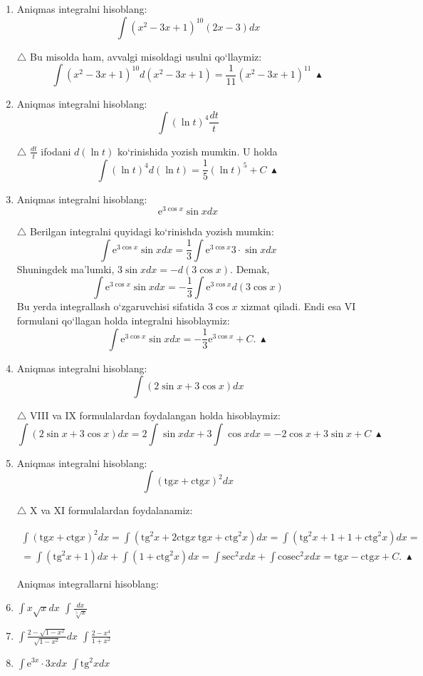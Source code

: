 \begin{enumerate}
	\item Aniqmas integralni hisoblang:
	$$\int (x^{2}-3x+1)^{10}(2x-3)dx$$
	
	$\triangle$ Bu misolda ham, avvalgi misoldagi usulni qo`llaymiz:
	$$\int (x^{2}-3x+1)^{10}d(x^{2}-3x+1)=\frac{1}{11}(x^{2}-3x+1)^{11}\ \blacktriangle$$
	
	\item Aniqmas integralni hisoblang:
	$$\int (\ln{t})^{4}\frac{dt}{t}$$
	
	$\triangle$ $\frac{dt}{t}$ ifodani $d(\ln{t})$ ko`rinishida yozish mumkin. U holda 
	$$\int (\ln{t})^{4}d(\ln{t})=\frac{1}{5}(\ln{t})^{5}+C\ \blacktriangle$$
	
	\item Aniqmas integralni hisoblang:
	$$\textrm{e}^{3\cos{x}}\sin{x}dx$$
	
	$\triangle$ Berilgan integralni quyidagi ko`rinishda yozish mumkin:
	$$\int \textrm{e}^{3\cos{x}}\sin{x}dx=\frac{1}{3}\int \textrm{e}^{3\cos{x}}3\cdot\sin{x}dx $$
	Shuningdek ma'lumki, $3\sin{x}dx=-d(3\cos{x})$. Demak,
	$$\int \textrm{e}^{3\cos{x}}\sin{x}dx=-\frac{1}{3}\int \textrm{e}^{3\cos{x}}d(3\cos{x})$$
	Bu yerda integrallash o`zgaruvchisi sifatida $3\cos{x}$ xizmat qiladi. Endi esa VI formulani qo`llagan holda integralni hisoblaymiz:
	$$\int \textrm{e}^{3\cos{x}}\sin{x}dx=-\frac{1}{3}\textrm{e}^{3\cos{x}}+C.\ \blacktriangle $$
	
	\item Aniqmas integralni hisoblang:
	$$\int (2\sin{x}+3\cos{x})dx$$
	
	$\triangle$ VIII va IX formulalardan foydalangan holda hisoblaymiz:
	$$\int (2\sin{x}+3\cos{x})dx=2\int \sin{x}dx + 3\int \cos{x}dx=-2\cos{x}+3\sin{x}+C\ \blacktriangle$$
	
	\item Aniqmas integralni hisoblang:
	$$\int (\textrm{tg}x+\textrm{ctg}x)^{2}dx$$
	
	$\triangle$ X va XI formulalardan foydalanamiz:
	
	\begin{multline*}
		\int (\textrm{tg}x+\textrm{ctg}x)^{2}dx =\int \left( \textrm{tg}^{2}x+2\textrm{ctg}x\ \textrm{tg}x+\textrm{ctg}^{2}x \right)dx= \int (\textrm{tg}^{2}x+1+1+\textrm{ctg}^{2}x)dx=\\
		=\int(\textrm{tg}^{2}x+1)dx+\int (1+\textrm{ctg}^{2}x)dx=\int \textrm{sec}^{2}xdx+\int \textrm{cosec}^{2}xdx=\textrm{tg}x-\textrm{ctg}x+C.\  \blacktriangle
	\end{multline*}

 Aniqmas integrallarni hisoblang:

\item $\int x\sqrt{x}dx$
\inlineitem $\int \frac{dx}{\sqrt[5]{x}}$

\item $ \int \frac{2-\sqrt{1-x^{2}}}{\sqrt{1-x^{2}}}dx$
\inlineitem $\int \frac{2-x^{4}}{1+x^{2}}$

\item $\int \textrm{e}^{3x}\cdot3xdx$
\inlineitem $\int \textrm{tg}^{2}xdx$

	
\end{enumerate}



